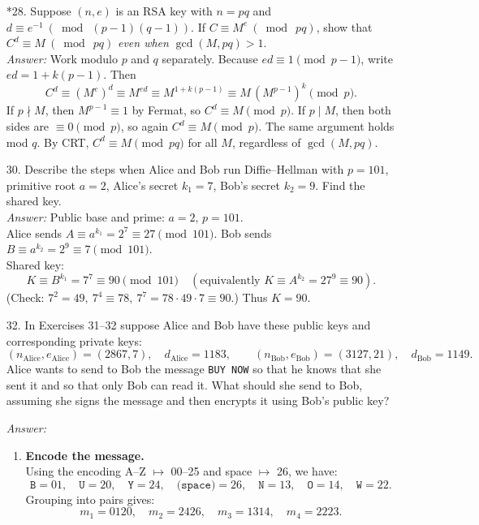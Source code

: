 \documentclass{article}
\begin{document}
\begin{itemize}
    \medskip

    \item[*28.] Suppose $(n,e)$ is an RSA key with $n=pq$ and $d\equiv e^{-1}\ (\bmod\ (p-1)(q-1))$. If $C\equiv M^{e}\ (\bmod\ pq)$, show that \(C^{d}\equiv M\ (\bmod\ pq)\) \emph{even when} $\gcd(M,pq)>1$.
    \medskip\\
    \textit{Answer:} Work modulo $p$ and $q$ separately. Because \(ed\equiv 1\pmod{p-1}\), write \(ed=1+k(p-1)\). Then
    \[
      C^d\equiv (M^e)^d \equiv M^{ed}\equiv M^{1+k(p-1)}\equiv M\,(M^{p-1})^k\pmod p.
    \]
    If $p\nmid M$, then \(M^{p-1}\equiv 1\) by Fermat, so \(C^d\equiv M\pmod p\). If $p\mid M$, then both sides are $\equiv 0\pmod p$, so again \(C^d\equiv M\pmod p\). The same argument holds mod $q$. By CRT, \(C^d\equiv M\pmod{pq}\) for all $M$, regardless of $\gcd(M,pq)$.

    \medskip

    \item[30.] Describe the steps when Alice and Bob run Diffie–Hellman with $p=101$, primitive root $a=2$, Alice’s secret $k_1=7$, Bob’s secret $k_2=9$. Find the shared key.
    \medskip\\
    \textit{Answer:} Public base and prime: $a=2,\,p=101$. \\
    Alice sends \(A\equiv a^{k_1}=2^7\equiv 27\pmod{101}\). \quad
    Bob sends \(B\equiv a^{k_2}=2^9\equiv 7\pmod{101}\). \\
    Shared key:
    \[
      K\equiv B^{k_1}=7^7\equiv 90\pmod{101}
      \quad(\text{equivalently }K\equiv A^{k_2}=27^9\equiv 90).
    \]
    (Check: \(7^2=49,\ 7^4\equiv 78,\ 7^7=78\cdot 49\cdot 7\equiv 90\).) Thus \(\boxed{K=90}\).

    \medskip

    \item[32.] In Exercises 31--32 suppose Alice and Bob have these public keys and corresponding private keys:
\[
(n_{\text{Alice}}, e_{\text{Alice}}) = (2867, 7), \quad d_{\text{Alice}} = 1183, \qquad
(n_{\text{Bob}}, e_{\text{Bob}}) = (3127, 21), \quad d_{\text{Bob}} = 1149.
\]
Alice wants to send to Bob the message \texttt{BUY NOW} so that he knows that she sent it and so that only Bob can read it. What should she send to Bob, assuming she signs the message and then encrypts it using Bob’s public key?

\medskip
\textit{Answer:}
\begin{enumerate}
    \item \textbf{Encode the message.} \\
    Using the encoding A–Z $\mapsto$ 00–25 and space $\mapsto$ 26, we have:
    \[
        \texttt{B}=01,\quad \texttt{U}=20,\quad \texttt{Y}=24,\quad \texttt{(space)}=26,\quad 
        \texttt{N}=13,\quad \texttt{O}=14,\quad \texttt{W}=22.
    \]
    Grouping into pairs gives:
    \[
        m_1 = 0120,\quad m_2 = 2426,\quad m_3 = 1314,\quad m_4 = 2223.
    \]


\end{enumerate}
\end{itemize}
\end{document}
